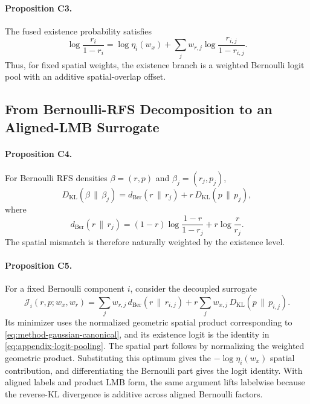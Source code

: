 \paragraph{Proposition C3.}
The fused existence probability satisfies
\begin{equation}
\log \frac{r_i}{1-r_i}
=
\log \eta_i(w_x)
+
\sum_j w_{r,j}\log\frac{r_{i,j}}{1-r_{i,j}}.
\label{eq:appendix-logit-pooling}
\end{equation}
Thus, for fixed spatial weights, the existence branch is a weighted Bernoulli logit pool with an additive spatial-overlap offset.

\subsection{From Bernoulli-RFS Decomposition to an Aligned-LMB Surrogate}

\paragraph{Proposition C4.}
For Bernoulli RFS densities $\beta=(r,p)$ and $\beta_j=(r_j,p_j)$,
\begin{equation}
D_{\mathrm{KL}}(\beta \,\|\, \beta_j)
=
d_{\mathrm{Ber}}(r\,\|\,r_j)
+
r\,D_{\mathrm{KL}}(p\,\|\,p_j),
\label{eq:appendix-bernoulli-kl}
\end{equation}
where
\begin{equation}
d_{\mathrm{Ber}}(r\,\|\,r_j)
=
(1-r)\log\frac{1-r}{1-r_j}
+
r\log\frac{r}{r_j}.
\end{equation}
The spatial mismatch is therefore naturally weighted by the existence level.

\paragraph{Proposition C5.}
For a fixed Bernoulli component $i$, consider the decoupled surrogate
\begin{equation}
\mathcal{J}_i(r,p;w_x,w_r)
=
\sum_j w_{r,j}\, d_{\mathrm{Ber}}(r\,\|\,r_{i,j})
+
r\sum_j w_{x,j}\, D_{\mathrm{KL}}(p\,\|\,p_{i,j}).
\label{eq:appendix-decoupled-bernoulli}
\end{equation}
Its minimizer uses the normalized geometric spatial product corresponding to \eqref{eq:method-gaussian-canonical}, and its existence logit is the identity in \eqref{eq:appendix-logit-pooling}. The spatial part follows by normalizing the weighted geometric product. Substituting this optimum gives the $-\log\eta_i(w_x)$ spatial contribution, and differentiating the Bernoulli part gives the logit identity. With aligned labels and product LMB form, the same argument lifts labelwise because the reverse-KL divergence is additive across aligned Bernoulli factors.

